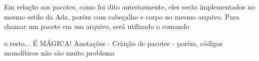 ﻿Em relação aos pacotes, como foi dito anteriormente, eles serão implementados
no mesmo estilo da Ada, porém com cabeçalho e corpo no mesmo arquivo. Para
chamar um pacote em um arquivo, será utilizado o comando 

o resto... É MÁGICA!
Anotações
- Criação de pacotes - porém, códigos monolíticos não são muito problema
